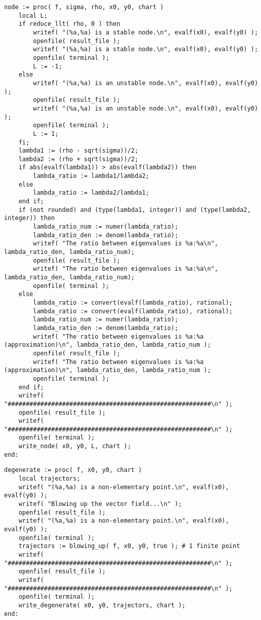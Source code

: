 \documentclass[a4paper,10pt]{article}
\begin{document}
\begin{lstlisting}[name=type]
node := proc( f, sigma, rho, x0, y0, chart )
    local L;
    if reduce_llt( rho, 0 ) then
        writef( "(%a,%a) is a stable node.\n", evalf(x0), evalf(y0) );
        openfile( result_file );
        writef( "(%a,%a) is a stable node.\n", evalf(x0), evalf(y0) );
        openfile( terminal );
        L := -1;
    else
        writef( "(%a,%a) is an unstable node.\n", evalf(x0), evalf(y0) );
        openfile( result_file );
        writef( "(%a,%a) is an unstable node.\n", evalf(x0), evalf(y0) );
        openfile( terminal );
        L := 1;
    fi;
    lambda1 := (rho - sqrt(sigma))/2;
    lambda2 := (rho + sqrt(sigma))/2;
    if abs(evalf(lambda1)) > abs(evalf(lambda2)) then
        lambda_ratio := lambda1/lambda2;
    else
        lambda_ratio := lambda2/lambda1;
    end if;
    if (not rounded) and (type(lambda1, integer)) and (type(lambda2, integer)) then 
        lambda_ratio_num := numer(lambda_ratio);
        lambda_ratio_den := denom(lambda_ratio);
        writef( "The ratio between eigenvalues is %a:%a\n", lambda_ratio_den, lambda_ratio_num);
        openfile( result_file );
        writef( "The ratio between eigenvalues is %a:%a\n", lambda_ratio_den, lambda_ratio_num);
        openfile( terminal );
    else
        lambda_ratio := convert(evalf(lambda_ratio), rational);
        lambda_ratio := convert(evalf(lambda_ratio), rational);
        lambda_ratio_num := numer(lambda_ratio);
        lambda_ratio_den := denom(lambda_ratio);
        writef( "The ratio between eigenvalues is %a:%a (approximation)\n", lambda_ratio_den, lambda_ratio_num );
        openfile( result_file );
        writef( "The ratio between eigenvalues is %a:%a (approximation)\n", lambda_ratio_den, lambda_ratio_num );
        openfile( terminal );
    end if;
    writef( "########################################################\n" );
    openfile( result_file );
    writef( "########################################################\n" );
    openfile( terminal );
    write_node( x0, y0, L, chart );
end:
\end{lstlisting}

\begin{lstlisting}[name=type]
degenerate := proc( f, x0, y0, chart )
    local trajectors;
    writef( "(%a,%a) is a non-elementary point.\n", evalf(x0), evalf(y0) );
    writef( "Blowing up the vector field...\n" );
    openfile( result_file );
    writef( "(%a,%a) is a non-elementary point.\n", evalf(x0), evalf(y0) );
    openfile( terminal );
    trajectors := blowing_up( f, x0, y0, true ); # 1 finite point
    writef( "########################################################\n" );
    openfile( result_file );
    writef( "########################################################\n" );
    openfile( terminal );
    write_degenerate( x0, y0, trajectors, chart );
end:
\end{lstlisting}
\end{document}
